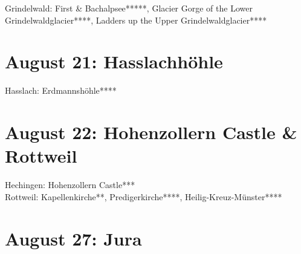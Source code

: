 Grindelwald: First \& Bachalpsee*****, Glacier Gorge of the Lower Grindelwaldglacier****, Ladders up the Upper Grindelwaldglacier****

\section{August 21: Hasslachh\"ohle}
\label{2010Hasslach}

Hasslach: Erdmannsh\"ohle****

\section{August 22: Hohenzollern Castle \& Rottweil}
\label{2010Hohenzollern}

Hechingen: Hohenzollern Castle***\\
Rottweil: Kapellenkirche**, Predigerkirche****, Heilig-Kreuz-M\"unster****

\section{August 27: Jura}
\label{jura2010}

